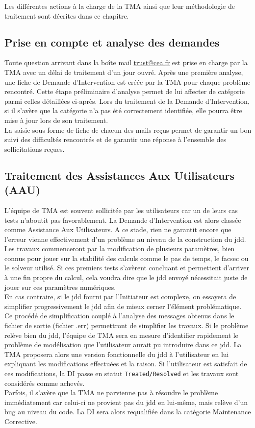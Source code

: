 Les différentes actions à la charge de la TMA ainsi que leur méthodologie de traitement sont décrites dans ce chapitre.
\subsection{Prise en compte et analyse des demandes}
Toute question arrivant dans la boîte mail \href{mailto:trust@cea.fr}{trust@cea.fr} est prise en charge par la TMA avec un délai de traitement d'un jour ouvré. Après une première analyse, une fiche de Demande d'Intervention est créée par la TMA pour chaque problème rencontré. Cette étape préliminaire d'analyse permet de lui affecter de catégorie parmi celles détaillées ci-après. Lors du traitement de la Demande d'Intervention, si il s'avère que la catégorie n'a pas été correctement identifiée, elle pourra être mise à jour lors de son traitement.\\
La saisie sous forme de fiche de chacun des mails reçus permet de garantir un bon suivi des difficultés rencontrés et de garantir une réponse à l'ensemble des sollicitations   re\c cues.
\subsection{Traitement des Assistances Aux Utilisateurs (AAU)}
L'équipe de TMA est souvent sollicitée par les utilisateurs car un de leurs cas tests n'aboutit pas favorablement. La Demande d'Intervention est alors classée comme Assistance Aux Utilisateurs. A ce stade, rien ne garantit encore que l'erreur vienne effectivement d'un problème au niveau de la construction du jdd. Les travaux commenceront par la modification de plusieurs paramètres, bien connus pour jouer sur la stabilité des calculs comme le pas de temps, le facsec ou le solveur utilisé. Si ces premiers tests s'avèrent concluant et permettent d'arriver à une fin propre du calcul, cela voudra dire que le jdd envoyé nécessitait juste de jouer sur ces paramètres numériques. \\
En cas contraire, si le jdd fourni par l'Initiateur est complexe, on essayera de simplifier progressivement le jdd afin de mieux cerner l'élément problématique. Ce procédé de simplification couplé à l'analyse des messages obtenus dans le fichier de sortie (fichier .err) permettront de simplifier les travaux. Si le problème relève bien du jdd, l'équipe de TMA sera en mesure d'identifier rapidement le problème de modélisation que l'utilisateur aurait pu introduire dans ce jdd. La TMA proposera alors une version fonctionnelle du jdd à l'utilisateur en lui expliquant les modifications effectuées et la raison. Si l'utilisateur est satisfait de ces modifications, la DI passe en statut \texttt{Treated/Resolved} et les travaux sont considérés comme achevés.\\
Parfois, il s'avère que la TMA ne parvienne pas à résoudre le problème immédiatement car celui-ci ne provient pas du jdd en lui-même, mais relève d'un bug au niveau du code. La DI sera alors requalifiée dans la catégorie Maintenance Corrective.\\

